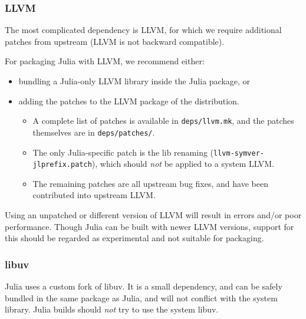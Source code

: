 \hypertarget{2251940844893656958}{}


\subsubsection{LLVM}



The most complicated dependency is LLVM, for which we require additional patches from upstream (LLVM is not backward compatible).



For packaging Julia with LLVM, we recommend either:



\begin{itemize}
\item bundling a Julia-only LLVM library inside the Julia package, or


\item adding the patches to the LLVM package of the distribution.

\begin{itemize}
\item A complete list of patches is available in \texttt{deps/llvm.mk}, and the patches themselves are in \texttt{deps/patches/}.


\item The only Julia-specific patch is the lib renaming (\texttt{llvm-symver-jlprefix.patch}), which should \emph{not} be applied to a system LLVM.


\item The remaining patches are all upstream bug fixes, and have been contributed into upstream LLVM.

\end{itemize}
\end{itemize}


Using an unpatched or different version of LLVM will result in errors and/or poor performance. Though Julia can be built with newer LLVM versions, support for this should be regarded as experimental and not suitable for packaging.



\hypertarget{4646697391847551863}{}


\subsubsection{libuv}



Julia uses a custom fork of libuv. It is a small dependency, and can be safely bundled in the same package as Julia, and will not conflict with the system library. Julia builds should \emph{not} try to use the system libuv.



